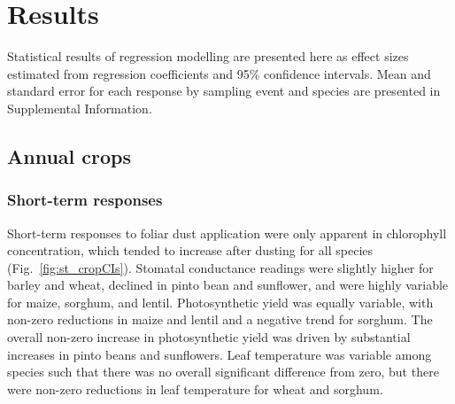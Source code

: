 \documentclass{svjour3}
\begin{document}
\section{Results} 

Statistical results of regression modelling are presented here as effect sizes estimated from regression coefficients and 95\% confidence intervals. 
Mean and standard error for each response by sampling event and species are presented in Supplemental Information. 

\subsection{Annual crops}

\subsubsection{Short-term responses}

Short-term responses to foliar dust application were only apparent in chlorophyll concentration, which tended to increase after dusting for all species (Fig.~\ref{fig:st_cropCIs}). 
Stomatal conductance readings were slightly higher for barley and wheat, declined in pinto bean and sunflower, and were highly variable for maize, sorghum, and lentil. 
Photosynthetic yield was equally variable, with non-zero reductions in maize and lentil and a negative trend for sorghum. 
The overall non-zero increase in photosynthetic yield was driven by substantial increases in pinto beans and sunflowers. 
Leaf temperature was variable among species such that there was no overall significant difference from zero, but there were non-zero reductions in leaf temperature for wheat and sorghum.  
\end{document}
